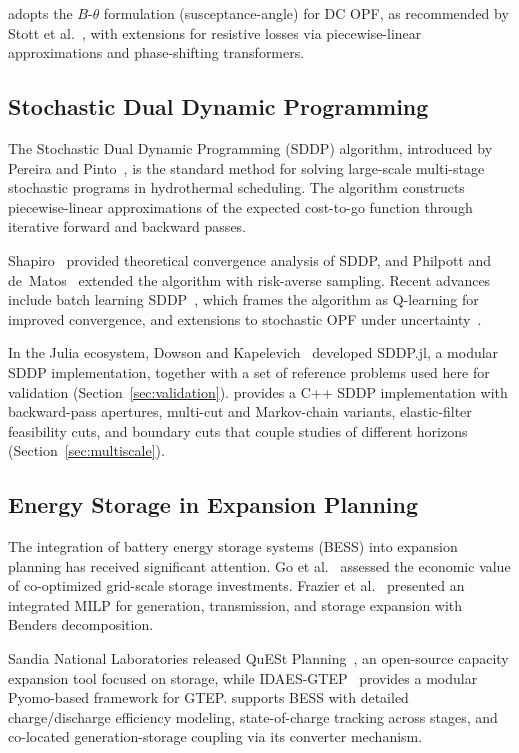 \gtopt{} adopts the $B$-$\theta$ formulation (susceptance-angle) for
DC OPF, as recommended by Stott et al.~\cite{stott2009dc_opf}, with
extensions for resistive losses via piecewise-linear approximations and
phase-shifting transformers.

\subsection{Stochastic Dual Dynamic Programming}

The Stochastic Dual Dynamic Programming (SDDP) algorithm, introduced by
Pereira and Pinto~\cite{pereira1991sddp}, is the standard method for
solving large-scale multi-stage stochastic programs in hydrothermal
scheduling.  The algorithm constructs piecewise-linear approximations of
the expected cost-to-go function through iterative forward and backward
passes.

Shapiro~\cite{shapiro2011sddp_analysis} provided theoretical convergence
analysis of SDDP, and Philpott and de~Matos~\cite{philpott2013sddp_convergence}
extended the algorithm with risk-averse sampling.  Recent advances include
batch learning SDDP~\cite{leclercq2023batch_sddp}, which frames the
algorithm as Q-learning for improved convergence, and extensions to
stochastic OPF under uncertainty~\cite{fletcher2024sddp_opf}.

In the Julia ecosystem, Dowson and Kapelevich~\cite{dowson2020sddp_jl}
developed SDDP.jl, a modular SDDP implementation, together with a set
of reference problems used here for validation
(Section~\ref{sec:validation}).  \gtopt{} provides a C++ SDDP
implementation with backward-pass apertures, multi-cut and Markov-chain
variants, elastic-filter feasibility cuts, and boundary cuts that couple
studies of different horizons (Section~\ref{sec:multiscale}).

\subsection{Energy Storage in Expansion Planning}

The integration of battery energy storage systems (BESS) into expansion
planning has received significant attention.  Go et al.~\cite{Go2016ess_expansion}
assessed the economic value of co-optimized grid-scale storage investments.
Frazier et al.~\cite{frazier2023bess_milp} presented an integrated MILP
for generation, transmission, and storage expansion with Benders
decomposition.

Sandia National Laboratories released QuESt Planning~\cite{sandia2024quest},
an open-source capacity expansion tool focused on storage, while
IDAES-GTEP~\cite{idaes_gtep2024} provides a modular Pyomo-based framework
for GTEP.  \gtopt{} supports BESS with detailed charge/discharge efficiency
modeling, state-of-charge tracking across stages, and co-located
generation-storage coupling via its converter mechanism.

